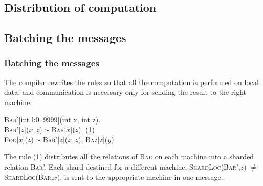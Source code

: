 \documentclass{beamer}
\begin{document}
\subsection{Distribution of computation}

\subsection{Batching the messages}
\frame
{
	\frametitle{Batching the messages}

	The compiler rewrites the rules so that all the computation is performed on local data, and communication is necessary only for sending the result to the right machine. \\
	

	\begin{block}{}
		\textsc{Bar}'[int l:0..9999](int x, int z). \\

		\textsc{Bar}'[$z$]($x,z$) :- \textsc{Bar}[$x$]($z$). \hspace{6.5cm} (1)\\

		\textsc{Foo}[$x$]($z$) :- \textsc{Bar}'[$z$]($x,z$), \textsc{Baz}[$z$]($y$) \\

	\end{block}

	The rule (1) distributes all the relations of \textsc{Bar} on each machine into a sharded relation \textsc{Bar}'. Each shard destined for a different machine, \textsc{ShardLoc}(\textsc{Bar}',$z$) $\neq$ \textsc{ShardLoc}(\textsc{Bar},$x$), is sent to the appropriate machine in one message.
	
}
\end{document}
